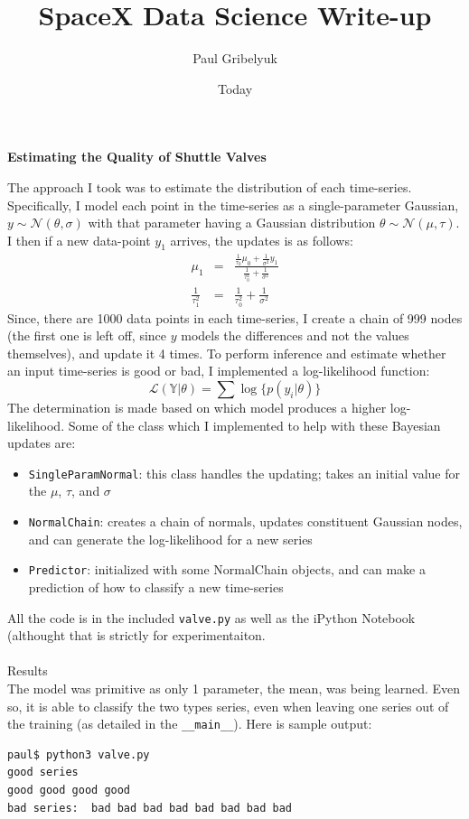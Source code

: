 \documentclass[]{amsart}
\begin{document}
\title{SpaceX Data Science Write-up}
\author{Paul Gribelyuk}
\date{Today}
\maketitle

\textbf{Estimating the Quality of Shuttle Valves}

The approach I took was to estimate the distribution of each time-series.  Specifically, I model each point in the time-series as a single-parameter Gaussian, $y\sim\mathcal{N}(\theta, \sigma)$ with that parameter having a Gaussian distribution $\theta\sim\mathcal{N}(\mu, \tau)$.  I then if a new data-point $y_1$ arrives, the updates is as follows:
\begin{eqnarray*}
\mu_1 &=& \frac{\frac{1}{\tau_0}\mu_0 + \frac{1}{\sigma^2}y_1}{\frac{1}{\tau^2_0} + \frac{1}{\sigma^2}} \\
\frac{1}{\tau^2_1} &=& \frac{1}{\tau^2_0} + \frac{1}{\sigma^2}
\end{eqnarray*}
Since, there are 1000 data points in each time-series, I create a chain of 999 nodes (the first one is left off, since $y$ models the differences and not the values themselves), and update it 4 times.  To perform inference and estimate whether an input time-series is good or bad, I implemented a log-likelihood function:
$$
\mathcal{L}(\mathbb{Y}|\theta) = \sum\log\{p(y_i|\theta)\}
$$
The determination is made based on which model produces a higher log-likelihood.  Some of the class which I implemented to help with these Bayesian updates are:
\begin{itemize}
\item \verb|SingleParamNormal|: this class handles the updating; takes an initial value for the $\mu$, $\tau$, and $\sigma$
\item \verb|NormalChain|: creates a chain of normals, updates constituent Gaussian nodes, and can generate the log-likelihood for a new series
\item \verb|Predictor|: initialized with some NormalChain objects, and can make a prediction of how to classify a new time-series
\end{itemize}

All the code is in the included \verb|valve.py| as well as the iPython Notebook (althought that is strictly for experimentaiton.\\
\\
Results\\
The model was primitive as only 1 parameter, the mean, was being learned.  Even so, it is able to classify the two types series, even when leaving one series out of the training (as detailed in the \verb|__main__|).  Here is sample output:
\begin{verbatim}
paul$ python3 valve.py
good series
good good good good
bad series:  bad bad bad bad bad bad bad bad
\end{verbatim}
\end{document}
